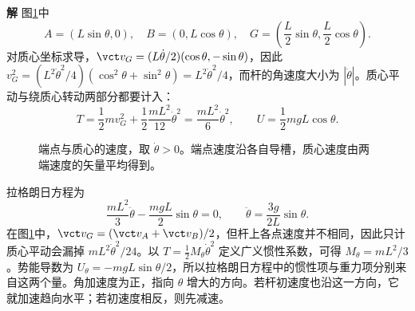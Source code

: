 \documentclass[11pt,openany,fontset=fandol]{ctexbook}
\theoremstyle{definition}\newtheorem{example}{例}[chapter]\newtheorem{exercise}{习题}[chapter]
\newcommand{\SolutionStart}{\par\medskip\ifdim\pagetotal>0pt\ifdim\dimexpr\pagegoal-\pagetotal\relax<3\baselineskip\newpage\fi\fi\noindent\textbf{解}\quad\ignorespaces}
\newenvironment{solution}{\SolutionStart}{\par\medskip}
\begin{document}
\begin{solution}
图\ref{mp5:fig:l5-e3-s}中
\[
A=(L\sin\theta,0),\quad B=(0,L\cos\theta),\quad
G=\left(\frac L2\sin\theta,\frac L2\cos\theta\right).
\]
对质心坐标求导，$\vct v_G=(L\dot\theta/2)(\cos\theta,-\sin\theta)$，因此 $v_G^2=(L^2\dot\theta^2/4)(\cos^2\theta+\sin^2\theta)=L^2\dot\theta^2/4$，而杆的角速度大小为 $|\dot\theta|$。质心平动与绕质心转动两部分都要计入：
\[
T=\frac12m v_G^2+\frac12\frac{mL^2}{12}\dot\theta^2
=\frac{mL^2}{6}\dot\theta^2,
\qquad U=\frac12mgL\cos\theta.
\]

\begin{figure}[H]\centering
{}
\caption{端点与质心的速度，取 $\dot\theta>0$。端点速度沿各自导槽，质心速度由两端速度的矢量平均得到。}\label{mp5:fig:l5-e3-s}
\end{figure}

拉格朗日方程为
\[
\frac{mL^2}{3}\ddot\theta-\frac{mgL}{2}\sin\theta=0,
\qquad\boxed{\ddot\theta=\frac{3g}{2L}\sin\theta.}
\]
在图\ref{mp5:fig:l5-e3-s}中，$\vct v_G=(\vct v_A+\vct v_B)/2$，但杆上各点速度并不相同，因此只计质心平动会漏掉 $mL^2\dot\theta^2/24$。以 $T=\tfrac12M_\theta\dot\theta^2$ 定义广义惯性系数，可得 $M_\theta=mL^2/3$。势能导数为 $U_\theta=-mgL\sin\theta/2$，所以拉格朗日方程中的惯性项与重力项分别来自这两个量。角加速度为正，指向 $\theta$ 增大的方向。若杆初速度也沿这一方向，它就加速趋向水平；若初速度相反，则先减速。


\end{solution}
\end{document}
